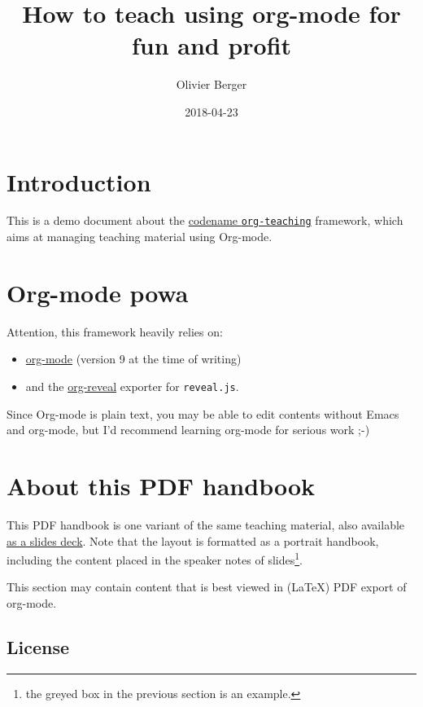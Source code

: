 \documentclass[a4paper]{article}
\author{Olivier Berger}
\date{2018-04-23}
\title{How to teach using org-mode for fun and profit}
\begin{document}
\setcounter{tocdepth}{1}
\tableofcontents


\section{Introduction}
\label{sec:org97a5ad4}

This is a demo document about the
\href{http://www-public.tem-tsp.eu/\~berger\_o/org-teaching/}{codename \texttt{org-teaching}} 
framework, which aims at managing teaching material using Org-mode.

\section{Org-mode powa}
\label{sec:orgfbdbd7f}

Attention, this framework heavily relies on: 

\begin{itemize}
\item \href{http://orgmode.org/}{org-mode} (version 9 at the time of writing)
\item and the \href{https://github.com/yjwen/org-reveal/}{org-reveal} exporter for \texttt{reveal.js}.
\end{itemize}

\begin{NOTES}
Since Org-mode is plain text, you may be able to edit contents without
Emacs and org-mode, but I'd recommend learning org-mode for serious
work ;-)
\end{NOTES}

\section{About this PDF handbook}
\label{sec:orgdd6bb61}

This PDF handbook is one variant of the same teaching material, also
available \href{./slides.html}{as a slides deck}. Note that the layout is
formatted as a portrait handbook, including the content placed in the
speaker notes of slides\footnote{the greyed box in the previous section is an example.}.

This section may contain content that is best viewed in (\LaTeX{}) PDF export of org-mode.

\subsection{License}
\label{sec:org647b2ad}
\end{document}
